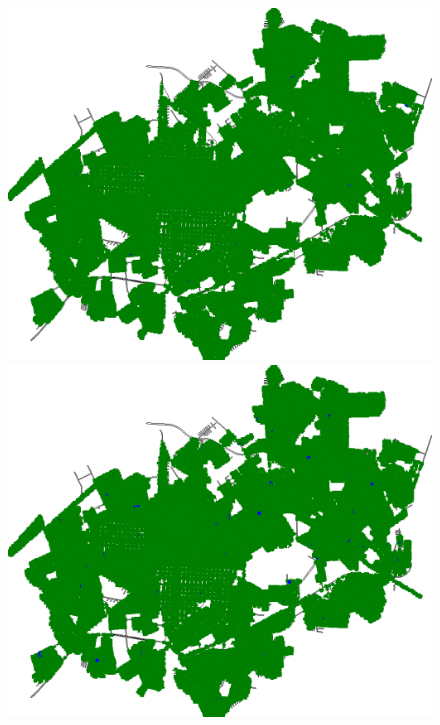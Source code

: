 \begin{figure}[H]
\begin{minipage}{.5\textwidth}
    \captionsetup{labelformat=empty}
  \end{minipage}
  \begin{minipage}{.5\textwidth}
    \centering
    \includegraphics[width=1.0\textwidth]{Figuras/Resultados/0003/Saidas/MonteCarlo_0/Simulacao_0/Espacial/00080.png}
    \captionsetup{labelformat=empty}
  \end{minipage}%
  \centering
  \begin{minipage}{.5\textwidth}
    \centering
    \includegraphics[width=1.0\textwidth]{Figuras/Resultados/0003/Saidas/MonteCarlo_0/Simulacao_0/Espacial/00120.png}

\end{minipage}
\end{figure}
